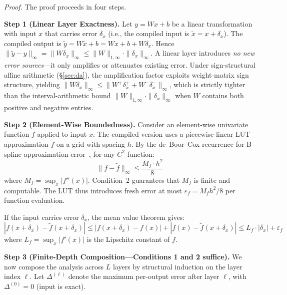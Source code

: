 \vspace{4pt}
\noindent\textit{Proof.} The proof proceeds in four steps.

\vspace{2pt}
\noindent\textbf{Step 1 (Linear Layer Exactness).}
Let $y = Wx + b$ be a linear transformation with input $x$ that carries
error $\delta_x$ (i.e., the compiled input is $\tilde{x} = x + \delta_x$).
The compiled output is $\tilde{y} = W\tilde{x} + b = Wx + b + W\delta_x$.
Hence $\|\tilde{y} - y\|_\infty = \|W\delta_x\|_\infty \leq
\|W\|_{1,\infty} \cdot \|\delta_x\|_\infty$. A linear layer
introduces \textit{no new error sources}---it only amplifies or attenuates
existing error. Under sign-structural affine arithmetic ({\S}\ref{sec:da}), the
amplification factor exploits weight-matrix sign structure, yielding
$\|W\delta_x\|_\infty \leq \|W^+\delta_x^+ + W^-\delta_x^-\|_\infty$,
which is strictly tighter than the interval-arithmetic bound
$\|W\|_{1,\infty} \cdot \|\delta_x\|_\infty$ when $W$ contains both
positive and negative entries.

\vspace{2pt}
\noindent\textbf{Step 2 (Element-Wise Boundedness).}
Consider an element-wise univariate function $f$ applied to input $x$.
The compiled version uses a piecewise-linear LUT approximation
$\tilde{f}$ on a grid with spacing $h$. By the de~Boor--Cox recurrence
for B-spline approximation error~\cite{deBoor1978}, for any $C^2$
function:
\begin{equation}
\|f - \tilde{f}\|_\infty \leq \frac{M_f \cdot h^2}{8}
\label{eq:de_boor_general}
\end{equation}
where $M_f = \sup_x |f''(x)|$. Condition~2 guarantees that $M_f$ is
finite and computable. The LUT thus introduces fresh error at most
$\varepsilon_f = M_f h^2 / 8$ per function evaluation.

If the input carries error $\delta_x$, the mean value theorem gives:
\begin{equation}
|f(x + \delta_x) - \tilde{f}(x + \delta_x)| \leq
|f(x + \delta_x) - f(x)| + |f(x) - \tilde{f}(x + \delta_x)|
\leq L_f \cdot |\delta_x| + \varepsilon_f
\label{eq:element_error}
\end{equation}
where $L_f = \sup_x |f'(x)|$ is the Lipschitz constant of $f$.

\vspace{2pt}
\noindent\textbf{Step 3 (Finite-Depth Composition---Conditions 1 and 2 suffice).}
We now compose the analysis across $L$ layers by structural induction on
the layer index $\ell$. Let $\Delta^{(\ell)}$ denote the maximum per-output
error after layer $\ell$, with $\Delta^{(0)} = 0$ (input is exact).

